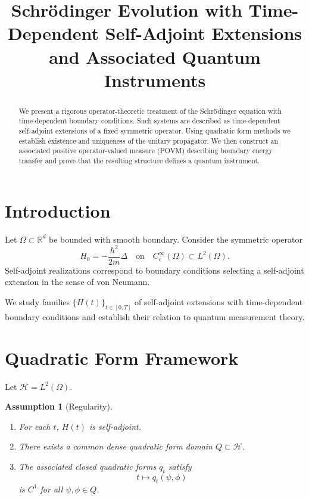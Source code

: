 \documentclass[11pt,a4paper]{article}
\title{Schr\"odinger Evolution with Time-Dependent Self-Adjoint Extensions\\
and Associated Quantum Instruments}
\author{}
\date{}
\newtheorem{assumption}[theorem]{Assumption}
\begin{document}
\maketitle

\begin{abstract}
We present a rigorous operator-theoretic treatment of the Schr\"odinger equation
with time-dependent boundary conditions. Such systems are described as
time-dependent self-adjoint extensions of a fixed symmetric operator.
Using quadratic form methods we establish existence and uniqueness of the
unitary propagator. We then construct an associated positive operator-valued
measure (POVM) describing boundary energy transfer and prove that the
resulting structure defines a quantum instrument.
\end{abstract}

\section{Introduction}

Let $\Omega \subset \mathbb{R}^d$ be bounded with smooth boundary.
Consider the symmetric operator
\[
H_0 = -\frac{\hbar^2}{2m}\Delta
\quad \text{on} \quad C_c^\infty(\Omega)\subset L^2(\Omega).
\]
Self-adjoint realizations correspond to boundary conditions selecting
a self-adjoint extension in the sense of von Neumann.

We study families $\{H(t)\}_{t\in[0,T]}$ of self-adjoint extensions
with time-dependent boundary conditions and establish
their relation to quantum measurement theory.

\section{Quadratic Form Framework}

Let $\mathcal H = L^2(\Omega)$.

\begin{assumption}[Regularity]
\begin{enumerate}[label=(\roman*)]
\item For each $t$, $H(t)$ is self-adjoint.
\item There exists a common dense quadratic form domain $Q\subset\mathcal H$.
\item The associated closed quadratic forms $q_t$ satisfy
\[
t\mapsto q_t(\psi,\phi)
\]
is $C^1$ for all $\psi,\phi\in Q$.
\end{enumerate}
\end{assumption}
\end{document}
